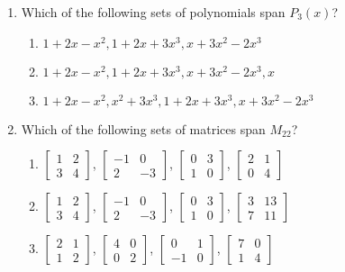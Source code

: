\begin{enumerate}
\begin{enumerate}
	\item Which of the following sets of polynomials span $P_3(x)$?
		\begin{enumerate}
			\item ${1 + 2 x - x^2, 1 + 2 x + 3 x^3, x + 3 x^2 - 2 x^3}$
			\item ${1 + 2 x - x^2, 1 + 2 x + 3 x^3, x + 3 x^2 - 2 x^3, x}$
			\item $1 + 2 x - x^2, x^2 + 3 x^3, 1 + 2 x + 3 x^3, x + 3 x^2 - 2 x^3$
		\end{enumerate}

	\item Which of the following sets of matrices span $M_{22}$?
\begin{multicols}{2}
		\begin{enumerate}
\item 
$\begin{bmatrix}
 1 & 2 \\
 3 & 4
\end{bmatrix}$,
$\begin{bmatrix}
 -1 & 0 \\
 2 & -3
\end{bmatrix}$,
$\begin{bmatrix}
 0 & 3 \\
 1 & 0
\end{bmatrix}$,
$\begin{bmatrix}
 2 & 1 \\
 0 & 4
\end{bmatrix}$

\item 
$\begin{bmatrix}
 1 & 2 \\
 3 & 4
\end{bmatrix}$,
$\begin{bmatrix}
 -1 & 0 \\
 2 & -3
\end{bmatrix}$,
$\begin{bmatrix}
 0 & 3 \\
 1 & 0
\end{bmatrix}$,
$\begin{bmatrix}
 3 & 13 \\
 7 & 11
\end{bmatrix}$

\item 
$\begin{bmatrix}
 2 & 1 \\
 1 & 2
\end{bmatrix}$,
$\begin{bmatrix}
 4 & 0 \\
 0 & 2
\end{bmatrix}$,
$\begin{bmatrix}
 0 & 1 \\
 -1 & 0
\end{bmatrix}$,
$\begin{bmatrix}
 7 & 0 \\
 1 & 4
\end{bmatrix}$


\end{enumerate}
\end{multicols}
\end{enumerate}
\end{enumerate}
